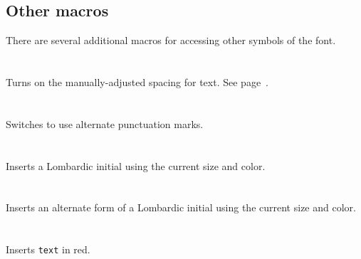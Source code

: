 \documentclass[a4paper, 12pt]{article}
\begin{document}
\subsection{Other macros}

There are several additional macros for accessing other symbols of the
font. 

\paragraph{}    \mbox{} \\

Turns on the manually-adjusted spacing for text. See
page~\pageref{pag:environments}.

\paragraph{}   \mbox{} \\

Switches to use alternate punctuation marks.

\paragraph{}  \mbox{} \\

Inserts a Lombardic initial using the current size and color. 

\paragraph{}   \mbox{} \\

Inserts an alternate form of a Lombardic initial using the current
size and color.

\paragraph{}   \mbox{} \\

Inserts \texttt{text} in red. 

\paragraph{}   \mbox{} \\
\end{document}
